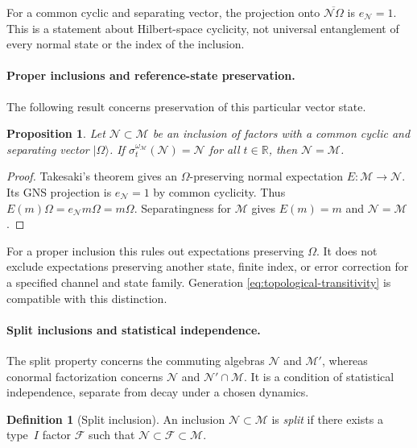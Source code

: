 \documentclass[a4paper,11pt]{article}
\newtheorem{proposition}[theorem]{Proposition}
\theoremstyle{definition}
\newtheorem{definition}{Definition}[section]
\begin{document}
For a common cyclic and separating vector, the projection onto
$\overline{\mathcal N\Omega}$ is $e_{\mathcal N}=1$.
This is a statement about Hilbert-space cyclicity, not universal entanglement
of every normal state or the index of the inclusion.

\paragraph{Proper inclusions and reference-state preservation.}
The following result concerns preservation of this particular vector state.

\begin{proposition}\label{prop:common-css-no-invariance}
Let $\mathcal{N}\subset\mathcal{M}$ be an inclusion of factors with a common cyclic and
separating vector $|\Omega\rangle$.  If $\sigma_t^{\omega_\mathcal{M}}(\mathcal{N})=\mathcal{N}$
for all $t\in\mathbb{R}$, then $\mathcal{N}=\mathcal{M}$.
\end{proposition}


\begin{proof}
Takesaki's theorem gives an $\Omega$-preserving normal expectation
$E:\mathcal M\to\mathcal N$. Its GNS projection is $e_{\mathcal N}=1$ by common
cyclicity. Thus $E(m)\Omega=e_{\mathcal N}m\Omega=m\Omega$.
Separatingness for $\mathcal M$ gives $E(m)=m$ and $\mathcal N=\mathcal M$.
\end{proof}

For a proper inclusion this rules out expectations preserving $\Omega$.
It does not exclude expectations preserving another state, finite index,
or error correction for a specified channel and state family.
Generation \eqref{eq:topological-transitivity} is compatible with this distinction.


\paragraph{Split inclusions and statistical independence.}
The split property concerns the commuting algebras $\mathcal N$ and $\mathcal M'$,
whereas conormal factorization concerns $\mathcal N$ and $\mathcal N'\cap\mathcal M$.
It is a condition of statistical independence, separate from decay under a chosen dynamics.

\begin{definition}[Split inclusion]\label{def:split}
An inclusion $\mathcal{N}\subset\mathcal{M}$ is \emph{split} if there exists a type~$I$
factor $\mathcal{F}$ such that $\mathcal{N}\subset\mathcal{F}\subset\mathcal{M}$.
\end{definition}
\end{document}
